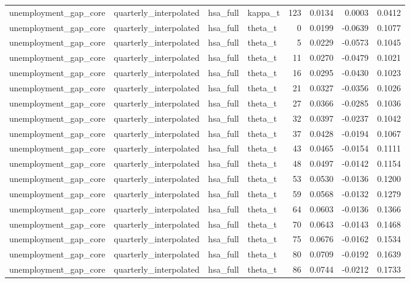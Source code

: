 \begin{tabular}{llllrrrr}
unemployment\_gap\_core & quarterly\_interpolated & hsa\_full & kappa\_t & 123 & 0.0134 & 0.0003 & 0.0412 \\
unemployment\_gap\_core & quarterly\_interpolated & hsa\_full & theta\_t & 0 & 0.0199 & -0.0639 & 0.1077 \\
unemployment\_gap\_core & quarterly\_interpolated & hsa\_full & theta\_t & 5 & 0.0229 & -0.0573 & 0.1045 \\
unemployment\_gap\_core & quarterly\_interpolated & hsa\_full & theta\_t & 11 & 0.0270 & -0.0479 & 0.1021 \\
unemployment\_gap\_core & quarterly\_interpolated & hsa\_full & theta\_t & 16 & 0.0295 & -0.0430 & 0.1023 \\
unemployment\_gap\_core & quarterly\_interpolated & hsa\_full & theta\_t & 21 & 0.0327 & -0.0356 & 0.1026 \\
unemployment\_gap\_core & quarterly\_interpolated & hsa\_full & theta\_t & 27 & 0.0366 & -0.0285 & 0.1036 \\
unemployment\_gap\_core & quarterly\_interpolated & hsa\_full & theta\_t & 32 & 0.0397 & -0.0237 & 0.1042 \\
unemployment\_gap\_core & quarterly\_interpolated & hsa\_full & theta\_t & 37 & 0.0428 & -0.0194 & 0.1067 \\
unemployment\_gap\_core & quarterly\_interpolated & hsa\_full & theta\_t & 43 & 0.0465 & -0.0154 & 0.1111 \\
unemployment\_gap\_core & quarterly\_interpolated & hsa\_full & theta\_t & 48 & 0.0497 & -0.0142 & 0.1154 \\
unemployment\_gap\_core & quarterly\_interpolated & hsa\_full & theta\_t & 53 & 0.0530 & -0.0136 & 0.1200 \\
unemployment\_gap\_core & quarterly\_interpolated & hsa\_full & theta\_t & 59 & 0.0568 & -0.0132 & 0.1279 \\
unemployment\_gap\_core & quarterly\_interpolated & hsa\_full & theta\_t & 64 & 0.0603 & -0.0136 & 0.1366 \\
unemployment\_gap\_core & quarterly\_interpolated & hsa\_full & theta\_t & 70 & 0.0643 & -0.0143 & 0.1468 \\
unemployment\_gap\_core & quarterly\_interpolated & hsa\_full & theta\_t & 75 & 0.0676 & -0.0162 & 0.1534 \\
unemployment\_gap\_core & quarterly\_interpolated & hsa\_full & theta\_t & 80 & 0.0709 & -0.0192 & 0.1639 \\
unemployment\_gap\_core & quarterly\_interpolated & hsa\_full & theta\_t & 86 & 0.0744 & -0.0212 & 0.1733 \\

\end{tabular}
